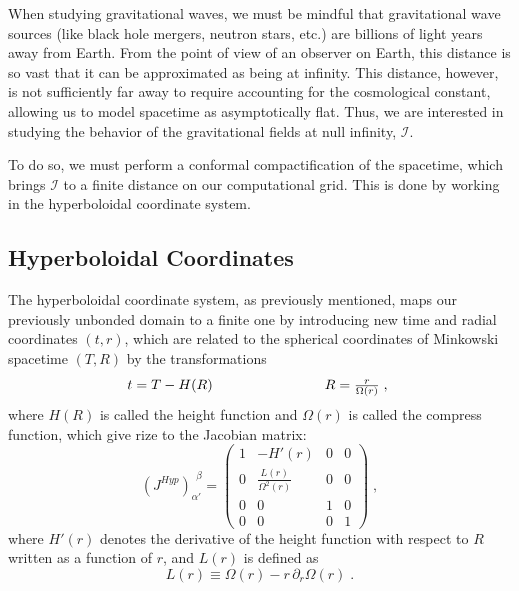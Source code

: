 When studying gravitational waves, we must be mindful that gravitational wave sources (like black hole mergers, neutron stars, etc.) are billions of light years away from Earth. From the point of view of an observer on Earth, this distance is so vast that it can be approximated as being at infinity. This distance, however, is not sufficiently far away to require accounting for the cosmological constant, allowing us to model spacetime as asymptotically flat. Thus, we are interested in studying the behavior of the gravitational fields at null infinity, $\mathscr{I}$.

To do so, we must perform a conformal compactification of the spacetime, which brings $\mathscr{I}$ to a finite distance on our computational grid. This is done by working in the hyperboloidal coordinate system.

\subsection{Hyperboloidal Coordinates}

The hyperboloidal coordinate system, as previously mentioned, maps our previously unbonded domain to a finite one by introducing new time and radial coordinates $(t,r)$, which are related to the spherical coordinates of Minkowski spacetime $(T,R)$ by the transformations
%
\begin{equation}
    \begin{array}{l c r} 
        t = T - H(R) & \qquad\qquad\qquad & R = \frac{r}{\Omega(r)} \; ,
    \end{array} \; 
\end{equation}
%
where $H(R)$ is called the height function and $\Omega(r)$ is called the compress function, which give rize to the Jacobian matrix:
%
\begin{equation}
    \left(J^{Hyp}\right)_{\alpha'}^{\ \ \beta} = 
    \begin{pmatrix}
        1 & -H'(r) & 0 & 0 \\
        0 & \frac{L(r)}{\Omega^2(r)} & 0 & 0 \\
        0 & 0 & 1 & 0 \\
        0 & 0 & 0 & 1
    \end{pmatrix} \; ,
\end{equation}
%
where $H'(r)$ denotes the derivative of the height function with respect to $R$ written as a function of $r$, and $L(r)$ is defined as
%
\begin{equation}
    L(r) \equiv \Omega(r) - r \, \partial_r \Omega(r) \; .
\end{equation}

